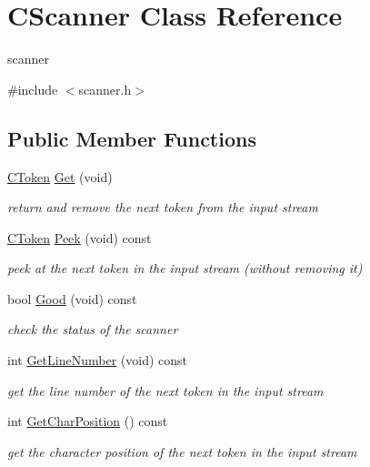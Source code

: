 \hypertarget{classCScanner}{\section{C\-Scanner Class Reference}
\label{classCScanner}
}


scanner  




{\ttfamily \#include $<$scanner.\-h$>$}

\subsection*{Public Member Functions}
\begin{DoxyCompactItemize}
\item 
\hyperlink{classCToken}{C\-Token} \hyperlink{classCScanner_aa743238b6e0f9bb4c0382619f8a4a3b5}{Get} (void)
\begin{DoxyCompactList}\small\item\em return and remove the next token from the input stream \end{DoxyCompactList}\item 
\hyperlink{classCToken}{C\-Token} \hyperlink{classCScanner_a14a98b8166965e2e65eb48b5540f2693}{Peek} (void) const 
\begin{DoxyCompactList}\small\item\em peek at the next token in the input stream (without removing it) \end{DoxyCompactList}\item 
bool \hyperlink{classCScanner_a06080e80d7e579c3983a4320e1e13693}{Good} (void) const 
\begin{DoxyCompactList}\small\item\em check the status of the scanner \end{DoxyCompactList}\item 
int \hyperlink{classCScanner_a4f19aa9722e4c9ca08249b4a1026bdf2}{Get\-Line\-Number} (void) const 
\begin{DoxyCompactList}\small\item\em get the line number of the next token in the input stream \end{DoxyCompactList}\item 
int \hyperlink{classCScanner_a3fded69d51acabe15f3c57332063d1ed}{Get\-Char\-Position} () const 
\begin{DoxyCompactList}\small\item\em get the character position of the next token in the input stream \end{DoxyCompactList}\end{DoxyCompactItemize}
